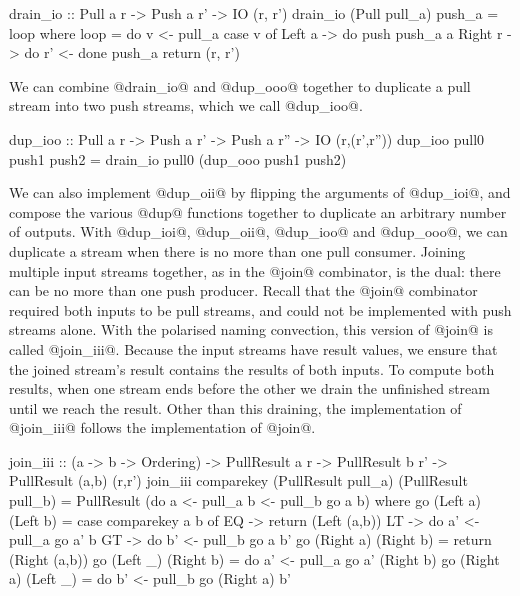 \begin{haskell}
drain_io :: Pull a r -> Push a r' -> IO (r, r')
drain_io (Pull pull_a) push_a = loop
 where
  loop = do
    v <- pull_a
    case v of
     Left a -> do
      push push_a a
     Right r -> do
      r' <- done push_a
      return (r, r')
\end{haskell}

We can combine @drain_io@ and @dup_ooo@ together to duplicate a pull stream into two push streams, which we call @dup_ioo@.

\begin{haskell}
dup_ioo :: Pull a r -> Push a r' -> Push a r'' -> IO (r,(r',r''))
dup_ioo pull0 push1 push2 = drain_io pull0 (dup_ooo push1 push2)
\end{haskell}

We can also implement @dup_oii@ by flipping the arguments of @dup_ioi@, and compose the various @dup@ functions together to duplicate an arbitrary number of outputs.
With @dup_ioi@, @dup_oii@, @dup_ioo@ and @dup_ooo@, we can duplicate a stream when there is no more than one pull consumer.
Joining multiple input streams together, as in the @join@ combinator, is the dual: there can be no more than one push producer.
Recall that the @join@ combinator required both inputs to be pull streams, and could not be implemented with push streams alone.
With the polarised naming convection, this version of @join@ is called @join_iii@.
Because the input streams have result values, we ensure that the joined stream's result contains the results of both inputs.
To compute both results, when one stream ends before the other we drain the unfinished stream until we reach the result.
Other than this draining, the implementation of @join_iii@ follows the implementation of @join@.

\begin{haskell}
join_iii :: (a -> b -> Ordering)
         -> PullResult a r
         -> PullResult b r'
         -> PullResult (a,b) (r,r')
join_iii comparekey (PullResult pull_a) (PullResult pull_b) = PullResult (do
   a <- pull_a
   b <- pull_b
   go a b)
 where
  go (Left a) (Left b)
   = case comparekey a b of
      EQ -> return (Left (a,b))
      LT -> do
        a' <- pull_a
        go a' b
      GT -> do
        b' <- pull_b
        go a b'
  go (Right a) (Right b) = return (Right (a,b))
  go (Left _) (Right b) = do
    a' <- pull_a
    go a' (Right b)
  go (Right a) (Left _) = do
    b' <- pull_b
    go (Right a) b'
\end{haskell}


